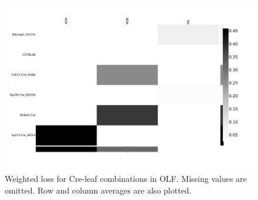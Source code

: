 \begin{figure}[H]
    \centering
    \includegraphics[width = 7in]{figs/lossdetails_698.png} 
    \caption{Weighted loss for Cre-leaf combinations in OLF.  Missing values are omitted.   Row and column averages are also plotted.}
\end{figure}

